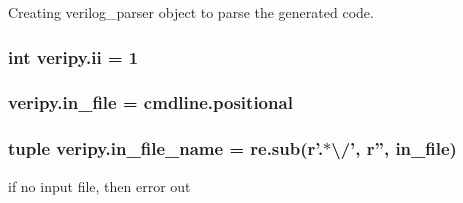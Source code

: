 Creating verilog\-\_\-parser object to parse the generated code. 

\hypertarget{namespaceveripy_a1ee51ba6e57cf9cc093a45eefcdb032e}{
\subsubsection[{ii}]{\setlength{\rightskip}{0pt plus 5cm}int veripy.\-ii = 1}}\label{namespaceveripy_a1ee51ba6e57cf9cc093a45eefcdb032e}
\hypertarget{namespaceveripy_af4fff95eb237e9d797e670d3c1a94b61}{
\subsubsection[{in\-\_\-file}]{\setlength{\rightskip}{0pt plus 5cm}veripy.\-in\-\_\-file = cmdline.\-positional}}\label{namespaceveripy_af4fff95eb237e9d797e670d3c1a94b61}
\hypertarget{namespaceveripy_a84ae1500ccef716a1a09a99a0e3711ec}{
\subsubsection[{in\-\_\-file\-\_\-name}]{\setlength{\rightskip}{0pt plus 5cm}tuple veripy.\-in\-\_\-file\-\_\-name = re.\-sub(r'.$\ast$\textbackslash{}/', r'', {\bf in\-\_\-file})}}\label{namespaceveripy_a84ae1500ccef716a1a09a99a0e3711ec}


if no input file, then error out 

